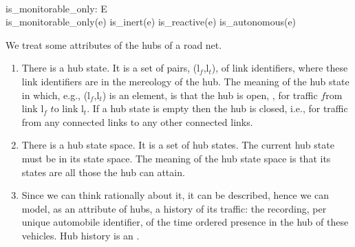 \bp
\>\ \ \ \\
\>\>\>is\_monitorable\_only: E {\RIGHTARROW} \\
\>\>\>is\_monitorable\_only(e) {\IS} is\_inert(e) {\VEE} is\_reactive(e) {\VEE} is\_autonomous(e)
\ep


\mnewfoil

\noindent\LLLL\HHHH
\begynd
\pind We treat some attributes of the hubs of a road net.
\afslut
\begin{enumerate}\setei
\item \label{h-attr-000} There is a hub state.
\begynd
\pind  It is a set of pairs, \textsf{(l$_f$,l$_t$)}, of link identifiers,
\begynd
\pind  where these link identifiers are in the mereology of the hub. 
\afslut
\pind The meaning of the hub  state
\begynd
\pind in which, e.g., \textsf{(l$_f$,l$_t$)} is an element, 
\pind is that the hub is open,  , 
\pind for traffic $f$rom link \textsf{l$_f$} $t$o link \textsf{l$_t$}.  
\pind If a hub state is empty
\pind then the hub is closed, i.e.,  
\pind for traffic from any
                         connected links to any other connected links.
\afslut
\afslut
\pos{\psno}{\mnewfoil}
\item \label{h-attr-010} There is a hub state space.
\begynd
\pind It is a set of hub states. 
\pind The current hub state must be in its state space.
\pind The meaning of the hub state space is 
\begynd
\pind that its states are all those the hub can attain.
\afslut
\afslut
\item \label{hub-traffic} Since we can think rationally about it,
\begynd
\pind it can be described, hence we can model, as an
                          attribute of hubs, a history of its traffic:
\begynd
\pind the recording, per unique automobile identifier, 
\pind of the time ordered presence in the hub of these vehicles.   
\afslut
\pind Hub history is an .
\afslut
\savei\end{enumerate}
\pos{\psno}{\mnewfoil}
\pos{\footsize}{\LLLL\HHHH\sf}
